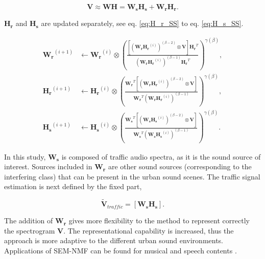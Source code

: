 \documentclass[review,5p,twocolumn,sort&compress,times]{elsarticle}
\begin{document}
\begin{equation}
\mathbf{V} \approx \mathbf{WH} = \mathbf{W_s H_s}+\mathbf{W_r H_r}.
\end{equation}

$\mathbf{H_r}$ and $\mathbf{H_s}$ are updated separately, see eq. \ref{eq:H_r_SS} to eq. \ref{eq:H_s_SS}.


{\scriptsize
\begin{subequations}\label{eq:WH-SSupdate}
\begin{align}
\mathbf{W_r}^{(i+1)} &\leftarrow \mathbf{W_r}^{(i)}\otimes\left(\frac{\left[\left(\mathbf{W_r H_r}^{(i)} \right)^{(\beta-2)}\otimes\mathbf{V} \right]\mathbf{H_r}^T}{\left(\mathbf{W_r H_r}^{(i)} \right)^{(\beta-1)}\mathbf{H_r}^T}\right)^{\gamma(\beta)}, \label{eq:W_r_SS}\\
\mathbf{H_r}^{(i+1)} &\leftarrow \mathbf{H_r}^{(i)}\otimes\left(\frac{\mathbf{W_r}^T \left[\left(\mathbf{W_r H_r}^{(i)} \right)^{(\beta-2)}\otimes\mathbf{V} \right]}{\mathbf{W_r}^T \left(\mathbf{W_r H_r}^{(i)} \right)^{(\beta-1)}}\right)^{\gamma(\beta)},\label{eq:H_r_SS}\\
\mathbf{H_s}^{(i+1)} &\leftarrow \mathbf{H_s}^{(i)}\otimes\left(\frac{\mathbf{W_s}^T \left[\left(\mathbf{W_s H_s}^{(i)} \right)^{(\beta-2)}\otimes\mathbf{V} \right]}{\mathbf{W_s}^T \left(\mathbf{W_s H_s}^{(i)} \right)^{(\beta-1)}}\right)^{\gamma(\beta)}.\label{eq:H_s_SS}
\end{align}
\end{subequations}}

In this study, $\mathbf{W_s}$ is composed of traffic audio spectra, as it is the sound source of interest. Sources included in $\mathbf{W_r}$ are other sound sources (corresponding to the interfering class) that can be present in the urban sound scenes. The traffic signal estimation is next defined by the fixed part,

\begin{equation}\label{eq:separationExtraction_SS}
\mathbf{\tilde{V}}_{traffic} = \left[ \mathbf{W_s H_s} \right].
\end{equation}

The addition of $\mathbf{W_r}$ gives more flexibility to the method to represent correctly the spectrogram $\mathbf{V}$. The representational capability is increased, thus the approach is more adaptive to the different urban sound environments. Applications of SEM-NMF can be found for musical \cite{weninger2012supervised, kitamura_music_2014} and speech contents \cite{joder2012real, mysore2011non}.
\end{document}
